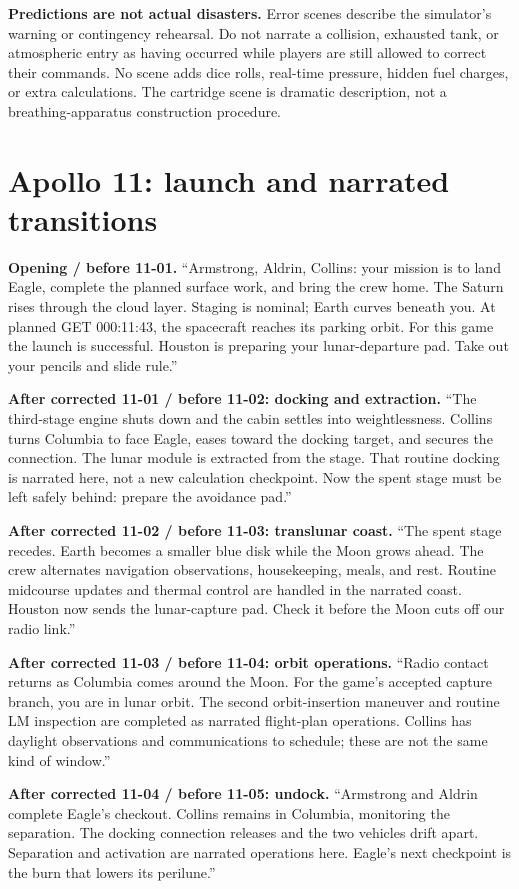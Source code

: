 \textbf{Predictions are not actual disasters.} Error scenes describe
the simulator's warning or contingency rehearsal. Do not narrate a
collision, exhausted tank, or atmospheric entry as having occurred
while players are still allowed to correct their commands.
No scene adds dice rolls, real-time pressure, hidden fuel charges, or
extra calculations. The cartridge scene is dramatic description,
not a breathing-apparatus construction procedure.

\clearpage
\section*{Apollo 11: launch and narrated transitions}
\textbf{Opening / before 11-01.}
``Armstrong, Aldrin, Collins: your mission is to land Eagle, complete
the planned surface work, and bring the crew home. The Saturn rises
through the cloud layer. Staging is nominal; Earth curves beneath you.
At planned GET 000:11:43, the spacecraft reaches its parking orbit.
For this game the launch is successful. Houston is preparing your
lunar-departure pad. Take out your pencils and slide rule.''

\textbf{After corrected 11-01 / before 11-02: docking and extraction.}
``The third-stage engine shuts down and the cabin settles into
weightlessness. Collins turns Columbia to face Eagle, eases toward
the docking target, and secures the connection. The lunar module is
extracted from the stage. That routine docking is narrated here,
not a new calculation checkpoint. Now the spent stage must be
left safely behind: prepare the avoidance pad.''

\textbf{After corrected 11-02 / before 11-03: translunar coast.}
``The spent stage recedes. Earth becomes a smaller blue disk while
the Moon grows ahead. The crew alternates navigation observations,
housekeeping, meals, and rest. Routine midcourse updates and thermal
control are handled in the narrated coast. Houston now sends the
lunar-capture pad. Check it before the Moon cuts off our radio link.''

\textbf{After corrected 11-03 / before 11-04: orbit operations.}
``Radio contact returns as Columbia comes around the Moon.
For the game's accepted capture branch, you are in lunar orbit.
The second orbit-insertion maneuver and routine LM inspection are
completed as narrated flight-plan operations. Collins has daylight
observations and communications to schedule; these are not the
same kind of window.''

\textbf{After corrected 11-04 / before 11-05: undock.}
``Armstrong and Aldrin complete Eagle's checkout.
Collins remains in Columbia, monitoring the separation.
The docking connection releases and the two vehicles drift apart.
Separation and activation are narrated operations here.
Eagle's next checkpoint is the burn that lowers its perilune.''

